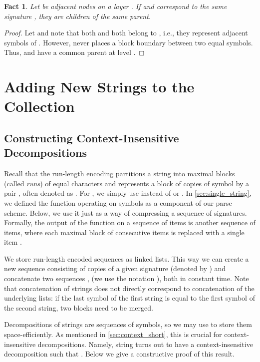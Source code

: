\documentclass[a4paper]{article}
\newtheorem{fact}[theorem]{Fact}
\theoremstyle{remark}
\begin{document}
\begin{fact}\label{fct:layer}
Let  be adjacent nodes on a layer .
If  and  correspond to the same signature , they are children of the same parent.
\end{fact}
\begin{proof}
  Let  and note that both  and  both belong to ,
i.e., they represent adjacent symbols of .
However,  never places a block boundary between two equal symbols.
Thus,  and  have a common parent at level .
\end{proof}

\section{Adding New Strings to the Collection}\label{sec:adding}

\subsection{Constructing Context-Insensitive Decompositions}\label{sec:constructing_cid}
Recall that the run-length encoding partitions a string into maximal blocks (called \emph{runs}) of equal characters
and represents a block of  copies of symbol  by a pair , often denoted as .
For , we simply use  instead of  or . 
In \cref{sec:single_string}, we defined the  function operating on symbols as a component of our parse scheme.
Below, we use it just as a way of compressing a sequence of signatures.
Formally, the output of the  function on a sequence of items
is another sequence of items,
where each maximal block of  consecutive items  is replaced with a single item .

We store run-length encoded sequences as linked lists. This way we can create a new sequence consisting of  copies
of a given signature  (denoted by ) and concatenate two sequences ,  (we use
the notation ), both in constant time.
Note that concatenation of strings does not directly correspond to concatenation of the underlying lists:
if the last symbol of the first string is equal to the first symbol of the second string, two blocks need to be merged.

Decompositions of strings are sequences of symbols, so we may use  to store them space-efficiently.
As mentioned in \cref{sec:context_short}, this is crucial for context-insensitive decompositions.
Namely, string  turns out to have a context-insensitive decomposition  such that .
Below we give a constructive proof of this result.
\end{document}
